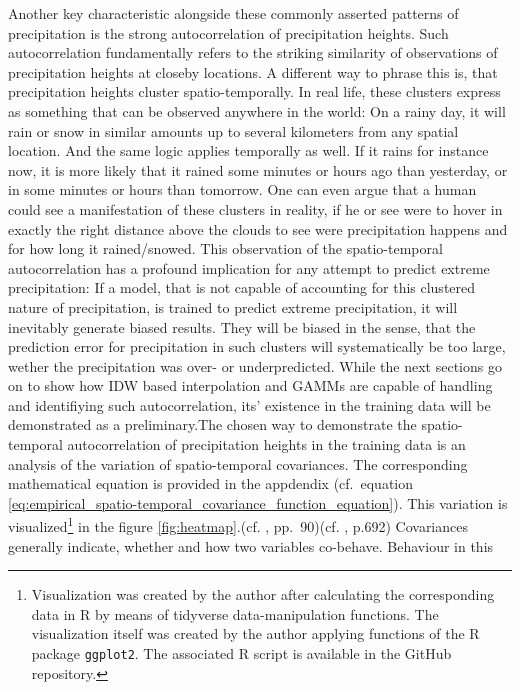 \documentclass[
  12pt,
]{article}
\begin{document}
Another key characteristic alongside these commonly asserted patterns of
precipitation is the strong autocorrelation of precipitation heights.
Such autocorrelation fundamentally refers to the striking similarity of
observations of precipitation heights at closeby locations. A different
way to phrase this is, that precipitation heights cluster
spatio-temporally. In real life, these clusters express as something
that can be observed anywhere in the world: On a rainy day, it will rain
or snow in similar amounts up to several kilometers from any spatial
location. And the same logic applies temporally as well. If it rains for
instance now, it is more likely that it rained some minutes or hours ago
than yesterday, or in some minutes or hours than tomorrow. One can even
argue that a human could see a manifestation of these clusters in
reality, if he or see were to hover in exactly the right distance above
the clouds to see were precipitation happens and for how long it
rained/snowed. This observation of the spatio-temporal autocorrelation
has a profound implication for any attempt to predict extreme
precipitation: If a model, that is not capable of accounting for this
clustered nature of precipitation, is trained to predict extreme
precipitation, it will inevitably generate biased results. They will be
biased in the sense, that the prediction error for precipitation in such
clusters will systematically be too large, wether the precipitation was
over- or underpredicted. While the next sections go on to show how IDW
based interpolation and GAMMs are capable of handling and identifiying
such autocorrelation, its' existence in the training data will be
demonstrated as a preliminary.\newline The chosen way to demonstrate the
spatio-temporal autocorrelation of precipitation heights in the training
data is an analysis of the variation of spatio-temporal covariances. The
corresponding mathematical equation is provided in the appdendix
(cf.~equation
\ref{eq:empirical_spatio-temporal_covariance_function_equation}). This
variation is
visualized\footnote{Visualization was created by the author after calculating the corresponding data in R by means of tidyverse data-manipulation functions. The visualization itself was created by the author applying functions of the R package \texttt{ggplot2}. The associated R script is available in the GitHub repository.}
in the figure \ref{fig:heatmap}.\newline (cf. \citet{Auer.2020},
pp.~90)(cf. \citet{Fahrmeir.2021}, p.692) Covariances generally
indicate, whether and how two variables co-behave. Behaviour in this
\end{document}
